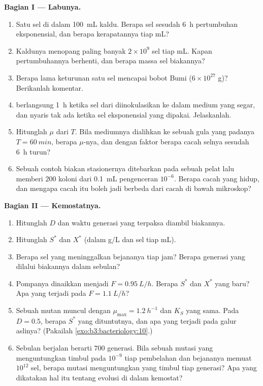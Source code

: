 \begin{problem}
\medskip
\noindent\textbf{Bagian I --- Labunya.}
\begin{enumerate}
  \item Satu sel di dalam \qty{100}{mL} kaldu. Berapa sel sesudah
        \qty{6}{h} pertumbuhan eksponensial, dan berapa kerapatannya tiap mL?
  \item Kaldunya menopang paling banyak $2\times 10^{9}$ sel tiap mL. Kapan
        pertumbuhannya berhenti, dan berapa massa sel biakannya?
  \item Berapa lama keturunan satu sel mencapai
        bobot Bumi ($6\times 10^{27}$ g)? Berikanlah komentar.
  \item {} berlangsung \qty{1}{h} ketika sel dari 
        diinokulasikan ke dalam medium yang segar, dan nyaris tak ada ketika
        sel eksponensial yang dipakai. Jelaskanlah.
  \item Hitunglah $\mu$ dari $T$. Bila mediumnya dialihkan ke sebuah gula yang
        padanya $T = \qty{60}{min}$, berapa $\mu$-nya, dan dengan faktor
        berapa cacah selnya sesudah \qty{6}{h} turun?
  \item Sebuah contoh biakan stasionernya ditebarkan pada sebuah pelat lalu
        memberi $200$ koloni dari \qty{0.1}{mL} pengenceran $10^{-6}$.
        Berapa cacah yang hidup, dan mengapa cacah itu boleh jadi berbeda dari
        cacah di bawah mikroskop?
\end{enumerate}

\medskip
\noindent\textbf{Bagian II --- Kemostatnya.}
\begin{enumerate}[resume]
  \item Hitunglah  $D$ dan waktu generasi yang terpaksa
        diambil biakannya.
  \item Hitunglah $S^{*}$ dan $X^{*}$ (dalam g/L dan sel tiap mL).
  \item Berapa sel yang meninggalkan bejananya tiap jam? Berapa generasi
        yang dilalui biakannya dalam sebulan?
  \item Pompanya dinaikkan menjadi $F = \qty{0.95}{L/h}$. Berapa $S^{*}$ dan
        $X^{*}$ yang baru? Apa yang terjadi pada $F = \qty{1.1}{L/h}$?
  \item Sebuah mutan muncul dengan $\mu_{\max} = \qty{1.2}{h^{-1}}$ dan
        $K_{S}$ yang sama. Pada $D = 0.5$, berapa $S^{*}$ yang dituntutnya, dan
        apa yang terjadi pada galur aslinya? (Pakailah
        \cref{exo:b3:bacteriology:10}.)
  \item Sebulan berjalan berarti $700$ generasi. Bila sebuah mutasi yang
        menguntungkan timbul pada $10^{-9}$ tiap pembelahan dan bejananya
        memuat $10^{12}$ sel, berapa mutasi menguntungkan yang timbul tiap
        generasi? Apa yang dikatakan hal itu tentang evolusi di dalam kemostat?
\end{enumerate}


\end{problem}
